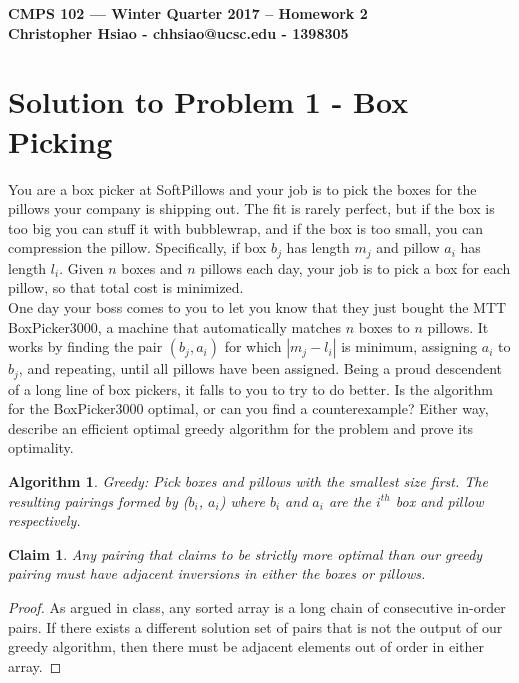 \documentclass[11pt]{article}
\begin{document}
\newtheorem{claim}[theorem]{Claim}
\newtheorem*{algo*}{Algorithm}
\newtheorem*{claim*}{Claim}
\newtheorem*{defn}{Definition}

\begin{center}
{\bf\Large CMPS 102 --- Winter Quarter 2017 --  Homework 2}\\
{\bf Christopher Hsiao - chhsiao@ucsc.edu - 1398305}
\end{center}

\section*{Solution to Problem 1 -  Box Picking}

You are a box picker at SoftPillows and your job is to pick the boxes for the pillows your company is shipping out. The fit is rarely perfect, but if the box is too big you can stuff it with bubblewrap, and if the box is too small, you can compression the pillow. Specifically, if box $b_j$ has length $m_j$ and pillow $a_i$ has length $l_i$. Given $n$ boxes and $n$ pillows each day, your job is to pick a box for each pillow, so that total cost is minimized.\\
One day your boss comes to you to let you know that they just bought the MTT BoxPicker3000, a machine that automatically matches $n$ boxes to $n$ pillows. It works by finding the pair $(b_j, a_i)$ for which $|m_j - l_i|$ is  minimum, assigning $a_i$ to $b_j$, and repeating, until all pillows have been assigned. Being a proud descendent of a long line of box pickers, it falls to you to try to do better. Is the algorithm for the BoxPicker3000 optimal, or can you find a counterexample? Either way, describe an efficient optimal greedy algorithm for the problem and prove its optimality.

\begin{algo*} Greedy: Pick boxes and pillows with the smallest size first. The resulting pairings formed by ($b_i$, $a_i$) where $b_i$ and $a_i$ are the $i^{th}$ box and pillow respectively.
\end{algo*}

\begin{claim*} 
Any pairing that claims to be strictly more optimal than our greedy pairing must have adjacent inversions in either the boxes or pillows.
\end{claim*}
\begin{proof} 
As argued in class, any sorted array is a long chain of consecutive in-order pairs. If there exists a different solution set of pairs that is not the output of our greedy algorithm, then there must be adjacent elements out of order in either array.
\end{proof}
\end{document}
